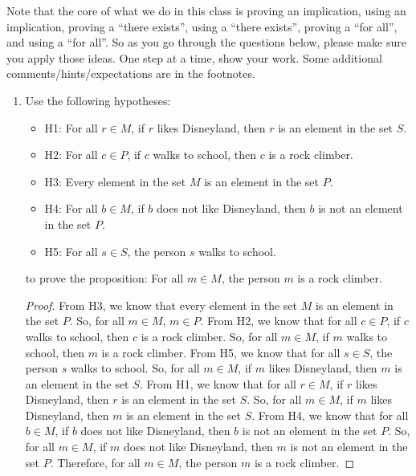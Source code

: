 \documentclass{article}
\begin{document}
\noindent Note that the core of what we do in this class is proving an implication, using an implication, proving a ``there exists'', using a ``there exists'', proving a ``for all'', and using a ``for all''. So as you go through the questions below, please make sure you apply those ideas. One step at a time, show your work. Some additional comments/hints/expectations are in the footnotes.
\begin{enumerate}

      \item Use the following hypotheses:
            \begin{itemize}
                  \item H1: For all $r \in M$, if $r$ likes Disneyland, then $r$ is an element in the
                        set $S$.
                  \item H2: For all $c \in P$, if $c$ walks to school, then $c$ is a rock climber.
                  \item H3: Every element in the set $M$ is an element in the set $P$.
                  \item H4: For all $b \in M$, if $b$ does not like Disneyland, then $b$ is not an
                        element in the set $P$.
                  \item H5: For all $s \in S$, the person $s$ walks to school.
            \end{itemize}

            to prove the proposition: For all $m \in M$, the person $m$ is a rock climber.

            \begin{proof}
                  From H3, we know that every element in the set $M$ is an element in the set $P$. So, for all $m \in M$, $m \in P$.
                  From H2, we know that for all $c \in P$, if $c$ walks to school, then $c$ is a rock climber. So, for all $m \in M$, if $m$ walks to school, then $m$ is a rock climber.
                  From H5, we know that for all $s \in S$, the person $s$ walks to school. So, for all $m \in M$, if $m$ likes Disneyland, then $m$ is an element in the set $S$.
                  From H1, we know that for all $r \in M$, if $r$ likes Disneyland, then $r$ is an element in the set $S$. So, for all $m \in M$, if $m$ likes Disneyland, then $m$ is an element in the set $S$.
                  From H4, we know that for all $b \in M$, if $b$ does not like Disneyland, then $b$ is not an element in the set $P$. So, for all $m \in M$, if $m$ does not like Disneyland, then $m$ is not an element in the set $P$.
                  Therefore, for all $m \in M$, the person $m$ is a rock climber.
            \end{proof}


\end{enumerate}
\end{document}
